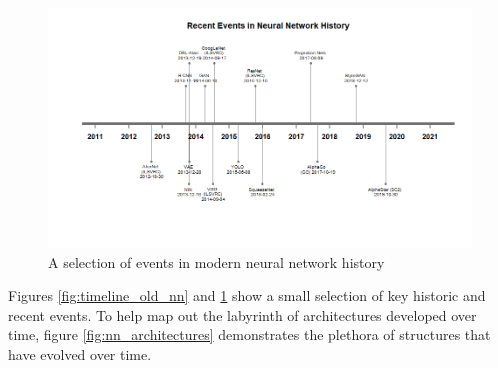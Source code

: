 \begin{figure}
    \centering
    \includegraphics[width=140mm,scale=1.5]{figs/timeline_new_nn.png}
    \caption{A selection of events in modern neural network history}
    \label{fig:timeline_new_nn}
\end{figure}

Figures \ref{fig:timeline_old_nn} and \ref{fig:timeline_new_nn} show a small selection of key historic and recent events. To help map out the labyrinth of architectures developed over time, figure \ref{fig:nn_architectures} demonstrates the plethora of structures that have evolved over time.

